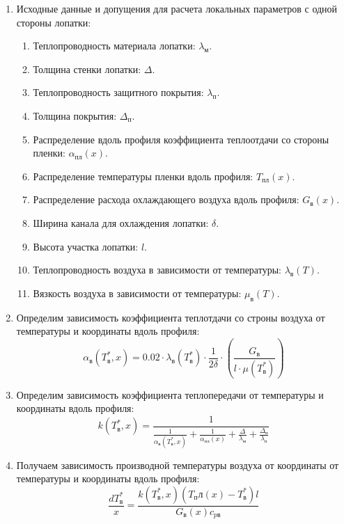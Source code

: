 \documentclass[a4paper,10pt]{article}
\begin{document}
    \begin{enumerate}

        \item Исходные данные и допущения для расчета локальных параметров с одной стороны лопатки:

        \begin{enumerate}
            \item Теплопроводность материала лопатки: $\lambda_м$.
            \item Толщина стенки лопатки: $\Delta$.
            \item Теплопроводность защитного покрытия: $\lambda_п$.
            \item Толщина покрытия: $\Delta_п$.
            \item Распределение вдоль профиля коэффициента теплоотдачи со стороны пленки: $\alpha_{пл} (x)$.
            \item Распределение температуры пленки вдоль профиля: $T_{пл} (x)$.
            \item Распределение расхода охлаждающего воздуха вдоль профиля: $G_в (x)$.
            \item Ширина канала для охлаждения лопатки: $\delta$.
            \item Высота участка лопатки: $l$.
            \item Теплопроводность воздуха в зависимости от температуры: $\lambda_в (T)$.
            \item Вязкость воздуха в зависимости от температуры: $\mu_в (T)$.
        \end{enumerate}

        \item Определим зависимость коэффициента теплотдачи со строны воздуха от температуры и координаты вдоль профиля:
        \[
            \alpha_в(T_в^*, x) = 0.02 \cdot \lambda_в \left( T_в^* \right) \cdot \frac{1}{2 \delta} \cdot
                \left(
                \frac{G_в }{l \cdot \mu \left( T_в^* \right)}
            \right)
        \]

        \item Определим зависимость коэффициента теплопередачи от температуры и координаты вдоль профиля:
        \[
            k (T_в^*, x) = \frac{1
                    }{
                \frac{1}{\alpha_в(T_в^*, x)} + \frac{1}{\alpha_{пл} (x)} + \frac{\Delta}{\lambda_м} +
                \frac{\Delta_п}{\lambda_п}
            }
        \]

        \item Получаем зависимость производной температуры воздуха от координаты от температуры и координаты
        вдоль профиля:
        \[
            \frac{dT_в^*}{x} = \frac{
                    k (T_в^*, x) (T_пл(x) - T_в^*) l
            }{
                    G_в(x) c_{pв}
            }
        \]


\end{enumerate}
\end{document}
